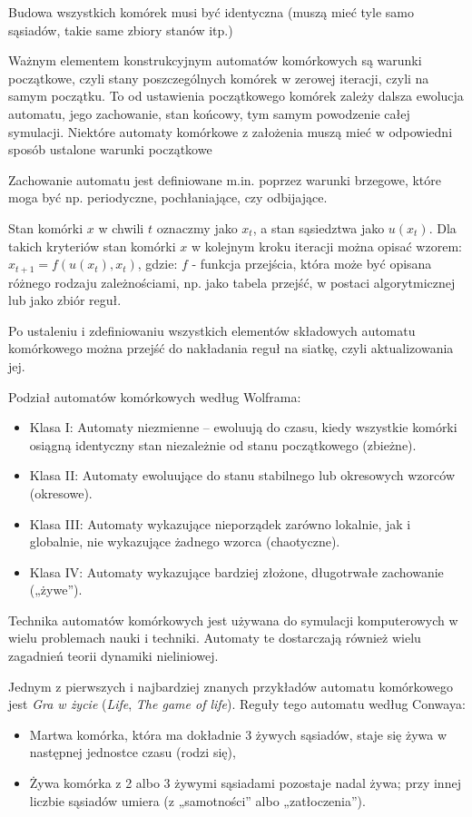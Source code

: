 Budowa wszystkich komórek musi być identyczna (muszą mieć tyle samo sąsiadów, takie same zbiory stanów itp.)

Ważnym elementem konstrukcyjnym automatów komórkowych są warunki początkowe, czyli stany poszczególnych komórek w zerowej iteracji, czyli na samym początku. To od ustawienia początkowego komórek zależy dalsza ewolucja automatu, jego zachowanie, stan końcowy, tym samym powodzenie całej symulacji. Niektóre automaty komórkowe z założenia muszą mieć w odpowiedni sposób ustalone warunki początkowe

Zachowanie automatu jest definiowane m.in. poprzez warunki brzegowe, które moga być np. periodyczne, pochłaniające, czy odbijające.

Stan komórki $ x $ w chwili $ t $ oznaczmy jako $ x_t $, a stan sąsiedztwa jako $ u(x_t) $. Dla takich kryteriów stan komórki $ x $ w kolejnym kroku iteracji można opisać wzorem:\newline
$ x_{t+1} = f(u(x_t), x_t) $, gdzie:\newline
$ f $ - funkcja przejścia, która może być opisana różnego rodzaju zależnościami, np. jako tabela przejść, w postaci algorytmicznej lub jako zbiór reguł.

Po ustaleniu i zdefiniowaniu wszystkich elementów składowych automatu komórkowego można przejść do nakładania reguł na siatkę, czyli aktualizowania jej.

Podział automatów komórkowych według Wolframa:
\begin{itemize}
	\item Klasa I: Automaty niezmienne – ewoluują do czasu, kiedy wszystkie komórki osiągną identyczny stan niezależnie od stanu początkowego (zbieżne).
	\item Klasa II: Automaty ewoluujące do stanu stabilnego lub okresowych wzorców (okresowe).
	\item Klasa III: Automaty wykazujące nieporządek zarówno lokalnie, jak i globalnie, nie wykazujące żadnego wzorca (chaotyczne).
	\item Klasa IV: Automaty wykazujące bardziej złożone, długotrwałe zachowanie („żywe”).
\end{itemize}

Technika automatów komórkowych jest używana do symulacji komputerowych w wielu problemach nauki i techniki. Automaty te dostarczają również wielu zagadnień teorii dynamiki nieliniowej.

Jednym z pierwszych i najbardziej znanych przykładów automatu komórkowego jest \textit{Gra w życie} (\textit{Life}, \textit{The game of life}). Reguły tego automatu według Conwaya:
\begin{itemize}
	\item Martwa komórka, która ma dokładnie 3 żywych sąsiadów, staje się żywa w następnej jednostce czasu (rodzi się),
	\item Żywa komórka z 2 albo 3 żywymi sąsiadami pozostaje nadal żywa; przy innej liczbie sąsiadów umiera (z „samotności” albo „zatłoczenia”).
\end{itemize}
